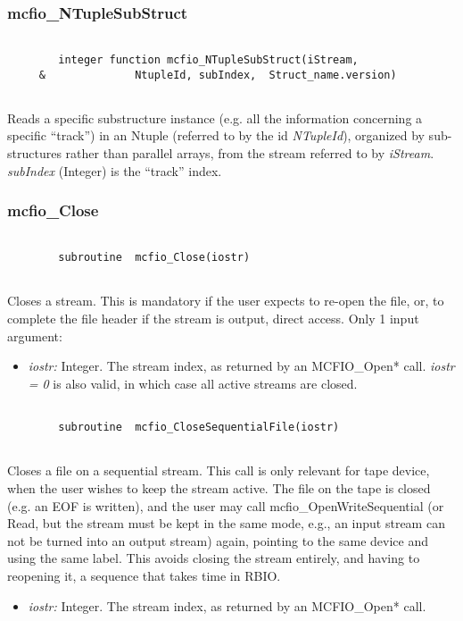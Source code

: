 \subsubsection{mcfio\_NTupleSubStruct}

\begin{verbatim}

        integer function mcfio_NTupleSubStruct(iStream,
     &              NtupleId, subIndex,  Struct_name.version)
     
\end{verbatim}

Reads a specific substructure instance (e.g. all the information concerning a
specific ``track'')  in an Ntuple (referred to by the id {\em NTupleId}), organized
by sub-structures rather than parallel arrays, from the stream referred to by {\em
iStream}.  {\em subIndex} (Integer) is the ``track'' index.  




\subsubsection{mcfio\_Close}

\begin{verbatim}

        subroutine  mcfio_Close(iostr)
    
\end{verbatim}

Closes a stream. This is mandatory if the user expects to re-open the  file,
or, to complete the file header if the stream is output, direct access. Only 
1 input argument:
\begin{itemize} 
\item {\em iostr:} Integer. The stream index, as returned by an MCFIO\_Open* 
call. {\em iostr = 0} is also valid, in which case all active streams are
closed.
\end{itemize}


\begin{verbatim}

        subroutine  mcfio_CloseSequentialFile(iostr)
    
\end{verbatim}

Closes a file on a sequential stream. This call is only relevant for 
tape device, when the user wishes to keep the stream active. The file 
on the tape is closed (e.g. an EOF is written), and the user may call 
mcfio\_OpenWriteSequential (or Read, but the stream must be kept in the 
same mode, e.g., an input stream can not be turned into an output stream) 
again, pointing to the same device and using the same label. This avoids 
closing the stream entirely, and having to reopening it, a sequence 
that takes time in RBIO. 
\begin{itemize} 
\item {\em iostr:} Integer. The stream index, as returned by an MCFIO\_Open* 
call.
\end{itemize}


